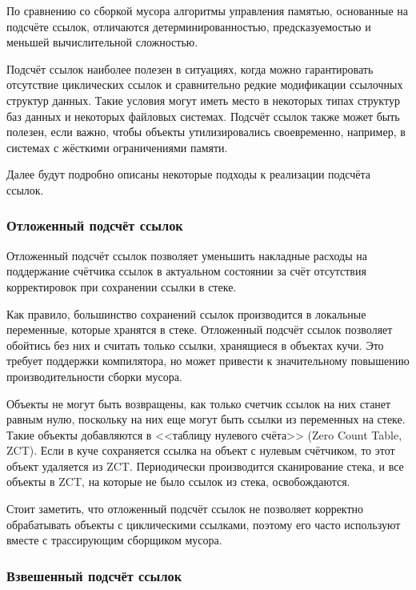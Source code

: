 По сравнению со сборкой мусора алгоритмы управления памятью, основанные на подсчёте ссылок, отличаются детерминированностью, предсказуемостью и меньшей вычислительной сложностью. \cite{cornell2} %

Подсчёт ссылок наиболее полезен в ситуациях, когда можно гарантировать отсутствие циклических ссылок и сравнительно редкие модификации ссылочных структур данных. Такие условия могут иметь место в некоторых типах структур баз данных и некоторых файловых системах. Подсчёт ссылок также может быть полезен, если важно, чтобы объекты утилизировались своевременно, например, в системах с жёсткими ограничениями памяти. \cite{recycling}

Далее будут подробно описаны некоторые подходы к реализации подсчёта ссылок. \cite{recycling}



\subsubsection{Отложенный подсчёт ссылок}

Отложенный подсчёт ссылок позволяет уменьшить накладные расходы на поддержание счётчика ссылок в актуальном состоянии за счёт отсутствия корректировок при сохранении ссылки в стеке. \cite{glossary}

Как правило, большинство сохранений ссылок производится в локальные переменные, которые хранятся в стеке. Отложенный подсчёт ссылок позволяет обойтись без них и считать только ссылки, хранящиеся в объектах кучи. Это требует поддержки компилятора, но может привести к значительному повышению производительности сборки мусора. \cite{glossary}

Объекты не могут быть возвращены, как только счетчик ссылок на них станет равным нулю, поскольку на них еще могут быть ссылки из переменных на стеке. Такие объекты добавляются в <<таблицу нулевого счёта>> (Zero Count Table, ZCT). Если в куче сохраняется ссылка на объект с нулевым счётчиком, то этот объект удаляется из ZCT. Периодически производится сканирование стека, и все объекты в ZCT, на которые не было ссылок из стека, освобождаются. \cite{glossary}

Стоит заметить, что отложенный подсчёт ссылок не позволяет корректно обрабатывать объекты с циклическими ссылками, поэтому его часто используют вместе с трассирующим сборщиком мусора. \cite{recycling}

\subsubsection{Взвешенный подсчёт ссылок}

